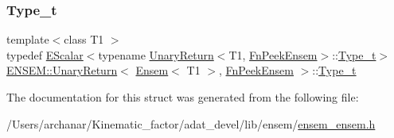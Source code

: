 \subsubsection{\texorpdfstring{Type\_t}{Type\_t}\hspace{0.1cm}{\footnotesize\ttfamily [2/2]}}
{\footnotesize\ttfamily template$<$class T1 $>$ \\
typedef \mbox{\hyperlink{classENSEM_1_1EScalar}{E\+Scalar}}$<$typename \mbox{\hyperlink{structENSEM_1_1UnaryReturn}{Unary\+Return}}$<$T1, \mbox{\hyperlink{structENSEM_1_1FnPeekEnsem}{Fn\+Peek\+Ensem}}$>$\+::\mbox{\hyperlink{structENSEM_1_1UnaryReturn_3_01Ensem_3_01T1_01_4_00_01FnPeekEnsem_01_4_a3bb59903a0e3c8d5e4b6ce0ac99c5454}{Type\+\_\+t}}$>$ \mbox{\hyperlink{structENSEM_1_1UnaryReturn}{E\+N\+S\+E\+M\+::\+Unary\+Return}}$<$ \mbox{\hyperlink{classENSEM_1_1Ensem}{Ensem}}$<$ T1 $>$, \mbox{\hyperlink{structENSEM_1_1FnPeekEnsem}{Fn\+Peek\+Ensem}} $>$\+::\mbox{\hyperlink{structENSEM_1_1UnaryReturn_3_01Ensem_3_01T1_01_4_00_01FnPeekEnsem_01_4_a3bb59903a0e3c8d5e4b6ce0ac99c5454}{Type\+\_\+t}}}



The documentation for this struct was generated from the following file\+:\begin{DoxyCompactItemize}
\item 
/\+Users/archanar/\+Kinematic\+\_\+factor/adat\+\_\+devel/lib/ensem/\mbox{\hyperlink{lib_2ensem_2ensem__ensem_8h}{ensem\+\_\+ensem.\+h}}\end{DoxyCompactItemize}
